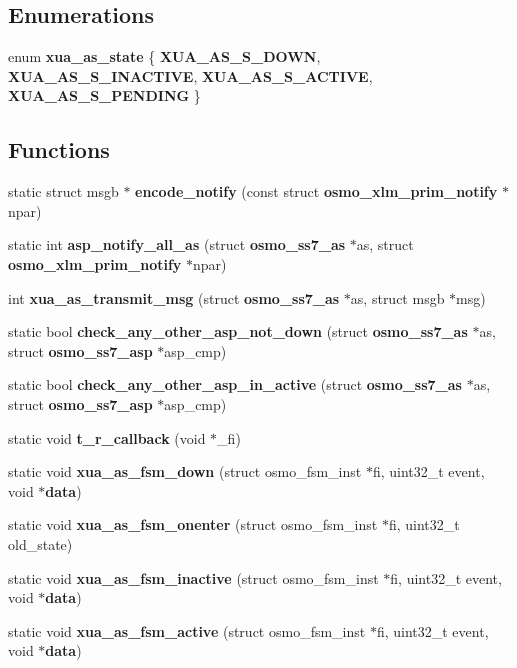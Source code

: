 \subsection*{Enumerations}
\begin{DoxyCompactItemize}
\item 
enum {\bf xua\+\_\+as\+\_\+state} \{ {\bf X\+U\+A\+\_\+\+A\+S\+\_\+\+S\+\_\+\+D\+O\+WN}, 
{\bf X\+U\+A\+\_\+\+A\+S\+\_\+\+S\+\_\+\+I\+N\+A\+C\+T\+I\+VE}, 
{\bf X\+U\+A\+\_\+\+A\+S\+\_\+\+S\+\_\+\+A\+C\+T\+I\+VE}, 
{\bf X\+U\+A\+\_\+\+A\+S\+\_\+\+S\+\_\+\+P\+E\+N\+D\+I\+NG}
 \}
\end{DoxyCompactItemize}
\subsection*{Functions}
\begin{DoxyCompactItemize}
\item 
static struct msgb $\ast$ {\bf encode\+\_\+notify} (const struct {\bf osmo\+\_\+xlm\+\_\+prim\+\_\+notify} $\ast$npar)
\item 
static int {\bf asp\+\_\+notify\+\_\+all\+\_\+as} (struct {\bf osmo\+\_\+ss7\+\_\+as} $\ast$as, struct {\bf osmo\+\_\+xlm\+\_\+prim\+\_\+notify} $\ast$npar)
\item 
int {\bf xua\+\_\+as\+\_\+transmit\+\_\+msg} (struct {\bf osmo\+\_\+ss7\+\_\+as} $\ast$as, struct msgb $\ast$msg)
\item 
static bool {\bf check\+\_\+any\+\_\+other\+\_\+asp\+\_\+not\+\_\+down} (struct {\bf osmo\+\_\+ss7\+\_\+as} $\ast$as, struct {\bf osmo\+\_\+ss7\+\_\+asp} $\ast$asp\+\_\+cmp)
\item 
static bool {\bf check\+\_\+any\+\_\+other\+\_\+asp\+\_\+in\+\_\+active} (struct {\bf osmo\+\_\+ss7\+\_\+as} $\ast$as, struct {\bf osmo\+\_\+ss7\+\_\+asp} $\ast$asp\+\_\+cmp)
\item 
static void {\bf t\+\_\+r\+\_\+callback} (void $\ast$\+\_\+fi)
\item 
static void {\bf xua\+\_\+as\+\_\+fsm\+\_\+down} (struct osmo\+\_\+fsm\+\_\+inst $\ast$fi, uint32\+\_\+t event, void $\ast${\bf data})
\item 
static void {\bf xua\+\_\+as\+\_\+fsm\+\_\+onenter} (struct osmo\+\_\+fsm\+\_\+inst $\ast$fi, uint32\+\_\+t old\+\_\+state)
\item 
static void {\bf xua\+\_\+as\+\_\+fsm\+\_\+inactive} (struct osmo\+\_\+fsm\+\_\+inst $\ast$fi, uint32\+\_\+t event, void $\ast${\bf data})
\item 
static void {\bf xua\+\_\+as\+\_\+fsm\+\_\+active} (struct osmo\+\_\+fsm\+\_\+inst $\ast$fi, uint32\+\_\+t event, void $\ast${\bf data})

\end{DoxyCompactItemize}
